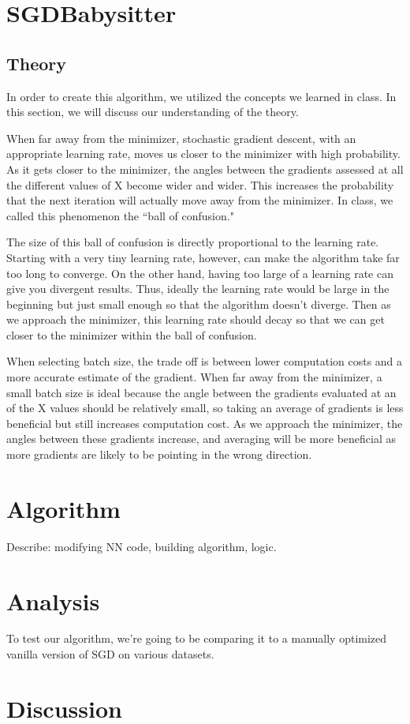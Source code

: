 \documentclass{article}
\begin{document}
\section*{SGDBabysitter} 

\subsection*{Theory}
\par In order to create this algorithm, we utilized the concepts we learned in class. In this section, we will discuss our understanding of the theory. 
\par When far away from the minimizer, stochastic gradient descent, with an appropriate learning rate, moves us closer to the minimizer with high probability. As it gets closer to the minimizer, the angles between the gradients assessed at all the different values of X become wider and wider. This increases the probability that the next iteration will actually move away from the minimizer. In class, we called this phenomenon the ``ball of confusion." 
\par The size of this ball of confusion is directly proportional to the learning rate. Starting with a very tiny learning rate, however, can make the algorithm take far too long to converge. On the other hand, having too large of a learning rate can give you divergent results. Thus, ideally the learning rate would be large in the beginning but just small enough so that the algorithm doesn't diverge. Then as we approach the minimizer, this learning rate should decay so that we can get closer to the minimizer within the ball of confusion. 
\par When selecting batch size, the trade off is between lower computation costs and a more accurate estimate of the gradient. When far away from the minimizer, a small batch size is ideal because the angle between the gradients evaluated at an of the X values should be relatively small, so taking an average of gradients is less beneficial but still increases computation cost. As we approach the minimizer, the angles between these gradients increase, and averaging will be more beneficial as more gradients are likely to be pointing in the wrong direction. 

\section*{Algorithm}
Describe: modifying NN code, building algorithm, logic. 

\section*{Analysis}

To test our algorithm, we're going to be comparing it to a manually optimized vanilla version of SGD on various datasets. 

\section*{Discussion}
\end{document}
